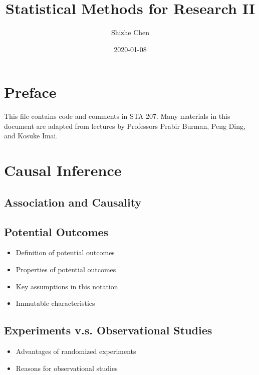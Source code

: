 \documentclass[12pt,]{book}
\title{Statistical Methods for Research II}
\author{Shizhe Chen}
\date{2020-01-08}
\providecommand{\tightlist}{%
  \setlength{\itemsep}{0pt}\setlength{\parskip}{0pt}}
\begin{document}
\maketitle

{
\setcounter{tocdepth}{1}
\tableofcontents
}
\chapter*{Preface}\label{pre}

This file contains code and comments in STA 207. Many materials in this
document are adapted from lectures by Professors Prabir Burman, Peng
Ding, and Kosuke Imai.

\chapter{Causal Inference}\label{ch:causal}

\section{Association and Causality}\label{association-and-causality}

\section{Potential Outcomes}\label{potential-outcomes}

\begin{itemize}
\tightlist
\item
  Definition of potential outcomes
\item
  Properties of potential outcomes
\item
  Key assumptions in this notation
\item
  Immutable characteristics
\end{itemize}

\section{Experiments v.s. Observational
Studies}\label{experiments-v.s.-observational-studies}

\begin{itemize}
\tightlist
\item
  Advantages of randomized experiments
\item
  Reasons for observational studies
\end{itemize}
\end{document}
